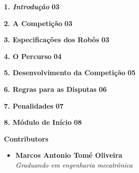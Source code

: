 \documentclass[journal]{IEEEtran}
\begin{document}
\begin{tcolorbox}[colback=gray!20, colframe=white, boxrule=0pt, arc=0pt]
\textbf{1. \textit{Introdução}} \hfill \textbf{03}
\end{tcolorbox}
\begin{tcolorbox}[colback=gray!20, colframe=white, boxrule=0pt, arc=0pt]
\textbf{2. A Competição} \hfill \textbf{03}
\end{tcolorbox}
\begin{tcolorbox}[colback=gray!20, colframe=white, boxrule=0pt, arc=0pt]
\textbf{3. Especificações dos Robôs} \hfill \textbf{03}
\end{tcolorbox}
\begin{tcolorbox}[colback=gray!20, colframe=white, boxrule=0pt, arc=0pt]
\textbf{4. O Percurso} \hfill \textbf{04}
\end{tcolorbox}
\begin{tcolorbox}[colback=gray!20, colframe=white, boxrule=0pt, arc=0pt]
\textbf{5. Desenvolvimento da Competição} \hfill \textbf{05}
\end{tcolorbox}
\begin{tcolorbox}[colback=gray!20, colframe=white, boxrule=0pt, arc=0pt]
\textbf{6. Regras para as Disputas} \hfill \textbf{06}
\end{tcolorbox}
\begin{tcolorbox}[colback=gray!20, colframe=white, boxrule=0pt, arc=0pt]
\textbf{7. Penalidades} \hfill \textbf{07}
\end{tcolorbox}
\begin{tcolorbox}[colback=gray!20, colframe=white, boxrule=0pt, arc=0pt]
\textbf{8. Módulo de Início} \hfill \textbf{08}
\end{tcolorbox}

\newpage
\begin{titlepage}
\begin{center}
    \Large\textbf{Contributors}\\[2em]

    \begin{itemize}
        \item \textbf{Marcos Antonio Tomé Oliveira} \\\textit{Graduando em engenharia mecatrônica}\\[0.5em]

    \end{itemize}

\end{center}
\end{titlepage}
\newpage
\end{document}
